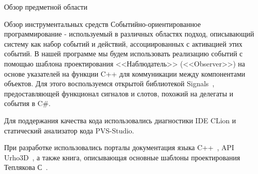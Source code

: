 \begin{section}{Обзор предметной области}
\begin{subsection}{Обзор инструментальных средств}
			Событийно-ориентированное программирование - используемый в различных областях подход, описывающий систему как набор событий и действий, ассоциированных с активацией этих событий.
			В нашей программе мы будем использовать реализацию событий с помощью шаблона проектирования <<Наблюдатель>> (<<Observer>>) на основе указателей на функции C++ для коммуникации между компонентами объектов.
			Для этого воспользуемся открытой библиотекой Signals~\cite{signals}, предоставляющей функционал сигналов и слотов, похожий на делегаты и события в C\#.

			Для поддержания качества кода использовались диагностики IDE CLion и статический анализатор кода PVS-Studio.

			При разработке использовались порталы документация языка C++~\cite{cppreference}, API Urho3D~\cite{urho3d-docs}, а также книга, описывающая основные шаблоны проектирования Теплякова С~\cite{teplyakov}.
		\end{subsection}


	\end{section}

